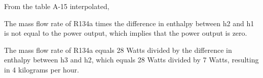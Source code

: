 From the table A-15 interpolated,

The mass flow rate of R134a times the difference in enthalpy between h2 and h1 is not equal to the power output, which implies that the power output is zero.

The mass flow rate of R134a equals 28 Watts divided by the difference in enthalpy between h3 and h2, which equals 28 Watts divided by 7 Watts, resulting in 4 kilograms per hour.